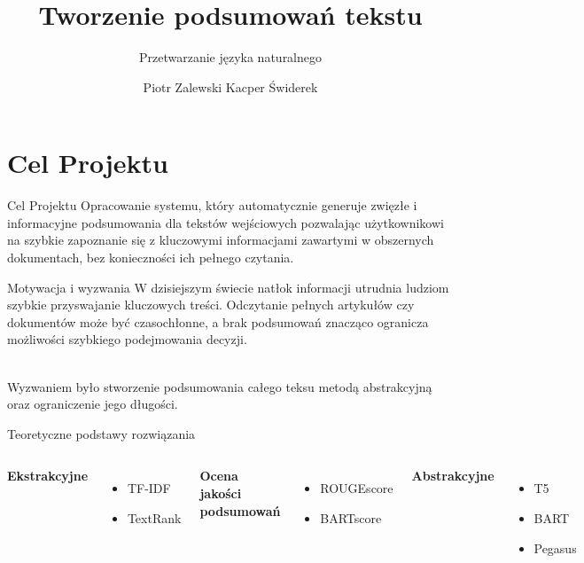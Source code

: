 \documentclass[aspectratio=169,xcolor=dvipsnames]{beamer}
\title{Tworzenie podsumowań tekstu}
\subtitle{Przetwarzanie języka naturalnego}
\author{Piotr Zalewski Kacper Świderek}
\begin{document}
\begin{frame}
    \titlepage
\end{frame}

\section{Cel Projektu}

\begin{frame}{Cel Projektu}
    Opracowanie systemu, który automatycznie generuje zwięzłe i informacyjne
podsumowania dla tekstów wejściowych pozwalając użytkownikowi na szybkie
zapoznanie się z kluczowymi informacjami zawartymi w obszernych dokumentach,
bez konieczności ich pełnego czytania.
\end{frame}


\begin{frame}{Motywacja i wyzwania}
    W dzisiejszym świecie natłok informacji utrudnia ludziom szybkie przyswajanie
kluczowych treści. Odczytanie pełnych artykułów czy dokumentów może być
czasochłonne, a brak podsumowań znacząco ogranicza możliwości szybkiego
podejmowania decyzji.\\~

Wyzwaniem było stworzenie podsumowania całego teksu metodą abstrakcyjną oraz
 ograniczenie jego długości.
\end{frame}


\begin{frame}{Teoretyczne podstawy rozwiązania}
    \begin{columns}[c] %

        \textbf{Ekstrakcyjne}
        \begin{itemize}
            \item TF-IDF
            \item TextRank \\~
        \end{itemize}

        \textbf{Ocena jakości podsumowań}
        \begin{itemize}
            \item ROUGEscore
            \item BARTscore
        \end{itemize}

        \textbf{Abstrakcyjne}
        \begin{itemize}
            \item T5
            \item BART
            \item Pegasus
        \end{itemize}
    \end{columns}
\end{frame}
\end{document}
